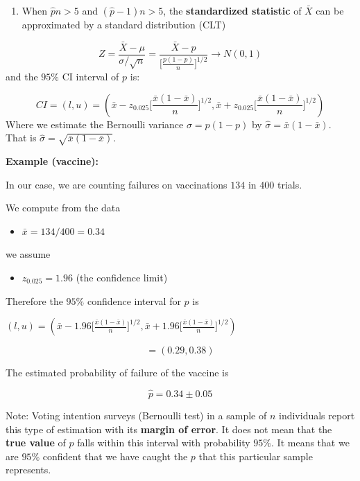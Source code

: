 \documentclass[
]{book}
\providecommand{\tightlist}{%
  \setlength{\itemsep}{0pt}\setlength{\parskip}{0pt}}
\begin{document}
\begin{enumerate}
\def\labelenumi{\arabic{enumi}.}
\tightlist
\item
  When \(\hat{p}n>5\) and \((\hat{p}-1)n>5\), the \textbf{standardized statistic} of \(\bar{X}\) can be approximated by a standard distribution (CLT)
\end{enumerate}

\[Z=\frac{\bar{X}-\mu}{\sigma/\sqrt{n}}= \frac{\bar{X}-p}{\big[\frac{p(1-p)}{n} \big]^{1/2}}\rightarrow N(0,1)\]
and the \(95\%\) CI interval of \(p\) is:

\[CI=(l,u)=(\bar{x}-z_{0.025}\big[\frac{\bar{x}(1-\bar{x})}{n} \big]^{1/2},  \bar{x}+z_{0.025}\big[\frac{\bar{x}(1-\bar{x})}{n} \big]^{1/2})\]
Where we estimate the Bernoulli variance \(\sigma=p(1-p)\) by \(\hat{\sigma}=\bar{x}(1-\bar{x})\). That is \(\hat{\sigma}=\sqrt{\bar{x}(1-\bar{x})}\).

\textbf{Example (vaccine):}

In our case, we are counting failures on vaccinations \(134\) in \(400\) trials.

We compute from the data

\begin{itemize}
\tightlist
\item
  \(\bar{x}=134/400=0.34\)
\end{itemize}

we assume

\begin{itemize}
\tightlist
\item
  \(z_{0.025}=1.96\) (the confidence limit)
\end{itemize}

Therefore the \(95\%\) confidence interval for \(p\) is

\((l,u)=(\bar{x}-1.96 \big[\frac{\bar{x}(1-\bar{x})}{n} \big]^{1/2}, \bar{x}+1.96 \big[\frac{\bar{x}(1-\bar{x})}{n} \big]^{1/2})\)

\[=(0.29,0.38)\]

The estimated probability of failure of the vaccine is

\[\hat{p}=0.34 \pm 0.05\]

Note: Voting intention surveys (Bernoulli test) in a sample of \(n\) individuals report this type of estimation with its \textbf{margin of error}. It does not mean that the \textbf{true value} of \(p\) falls within this interval with probability \(95\%\). It means that we are \(95\%\) confident that we have caught the \(p\) that this particular sample represents.
\end{document}
